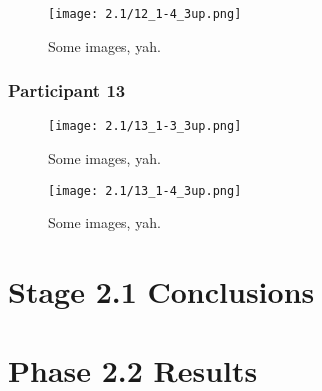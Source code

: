 \clearpage

\begin{figure}[h]
	\begin{center}
	\texttt{[image: 2.1/12\_1-4\_3up.png]}
	\caption{Some images, yah.}
	\end{center}
\end{figure}


\clearpage

\subsubsection{Participant 13}

\begin{figure}[h]
	\begin{center}
	\texttt{[image: 2.1/13\_1-3\_3up.png]}
	\caption{Some images, yah.}
	\end{center}
\end{figure}

\clearpage

\begin{figure}[h]
	\begin{center}
	\texttt{[image: 2.1/13\_1-4\_3up.png]}
	\caption{Some images, yah.}
	\end{center}
\end{figure}


\section{Stage 2.1 Conclusions}


\clearpage


\section{Phase 2.2 Results}


